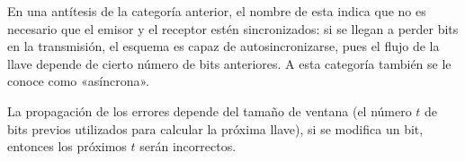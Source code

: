 En una antítesis de la categoría anterior, el nombre de esta indica que no es
necesario que el emisor y el receptor estén sincronizados: si se llegan a
perder bits en la transmisión, el esquema es capaz de autosincronizarse, pues
el flujo de la llave depende de cierto número de bits anteriores. A esta
categoría también se le conoce como «asíncrona».

La propagación de los errores depende del tamaño de ventana (el número $ t $
de bits previos utilizados para calcular la próxima llave), si se modifica un
bit, entonces los próximos $ t $ serán incorrectos.
